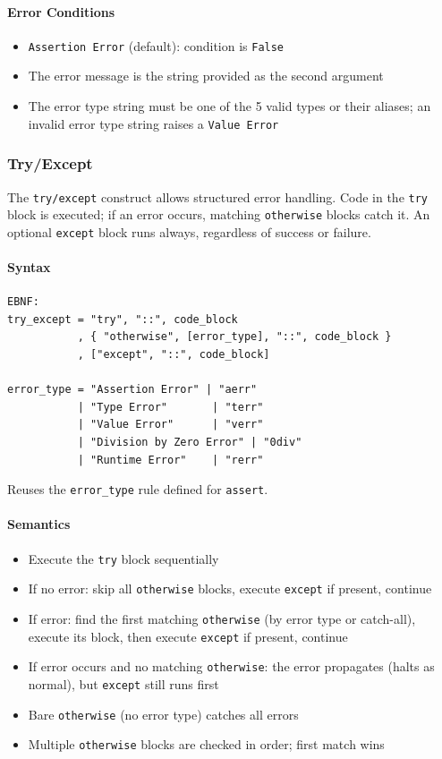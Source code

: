 \paragraph{Error Conditions}
\begin{itemize}
\item \texttt{Assertion Error} (default): condition is \texttt{False}
\item The error message is the string provided as the second argument
\item The error type string must be one of the 5 valid types or their aliases; an invalid error type string raises a \texttt{Value Error}
\end{itemize}

\subsubsection{Try/Except}
\label{sec:try-except}
The \texttt{try/except} construct allows structured error handling. Code in the \texttt{try} block is executed; if an error occurs, matching \texttt{otherwise} blocks catch it. An optional \texttt{except} block runs always, regardless of success or failure.

\paragraph{Syntax}
\begin{verbatim}
EBNF:
try_except = "try", "::", code_block
           , { "otherwise", [error_type], "::", code_block }
           , ["except", "::", code_block]

error_type = "Assertion Error" | "aerr"
           | "Type Error"       | "terr"
           | "Value Error"      | "verr"
           | "Division by Zero Error" | "0div"
           | "Runtime Error"    | "rerr"
\end{verbatim}

Reuses the \texttt{error\_type} rule defined for \texttt{assert}.

\paragraph{Semantics}
\begin{itemize}
\item Execute the \texttt{try} block sequentially
\item If no error: skip all \texttt{otherwise} blocks, execute \texttt{except} if present, continue
\item If error: find the first matching \texttt{otherwise} (by error type or catch-all), execute its block, then execute \texttt{except} if present, continue
\item If error occurs and no matching \texttt{otherwise}: the error propagates (halts as normal), but \texttt{except} still runs first
\item Bare \texttt{otherwise} (no error type) catches all errors
\item Multiple \texttt{otherwise} blocks are checked in order; first match wins
\end{itemize}

